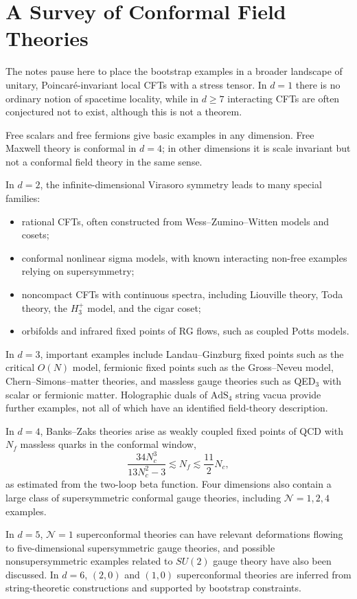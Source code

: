 \section{A Survey of Conformal Field Theories}

The notes pause here to place the bootstrap examples in a broader
landscape of unitary, Poincar\'e-invariant local CFTs with a stress
tensor.  In \(d=1\) there is no ordinary notion of spacetime locality,
while in \(d\ge7\) interacting CFTs are often conjectured not to exist,
although this is not a theorem.

Free scalars and free fermions give basic examples in any dimension.
Free Maxwell theory is conformal in \(d=4\); in other dimensions it is
scale invariant but not a conformal field theory in the same sense.

In \(d=2\), the infinite-dimensional Virasoro symmetry leads to many
special families:
\begin{itemize}
  \item rational CFTs, often constructed from Wess--Zumino--Witten
  models and cosets;
  \item conformal nonlinear sigma models, with known interacting
  non-free examples relying on supersymmetry;
  \item noncompact CFTs with continuous spectra, including Liouville
  theory, Toda theory, the \(H_3^+\) model, and the cigar coset;
  \item orbifolds and infrared fixed points of RG flows, such as
  coupled Potts models.
\end{itemize}

In \(d=3\), important examples include Landau--Ginzburg fixed points
such as the critical \(O(N)\) model, fermionic fixed points such as the
Gross--Neveu model, Chern--Simons--matter theories, and massless gauge
theories such as QED\(_3\) with scalar or fermionic matter.  Holographic
duals of \(\mathrm{AdS}_4\) string vacua provide further examples, not
all of which have an identified field-theory description.

In \(d=4\), Banks--Zaks theories arise as weakly coupled fixed points of
QCD with \(N_f\) massless quarks in the conformal window,
\[
  \frac{34N_c^3}{13N_c^2-3}
  \lesssim N_f
  \lesssim
  \frac{11}{2}N_c,
\]
as estimated from the two-loop beta function.  Four dimensions also
contain a large class of supersymmetric conformal gauge theories,
including \(\mathcal N=1,2,4\) examples.

In \(d=5\), \(\mathcal N=1\) superconformal theories can have relevant
deformations flowing to five-dimensional supersymmetric gauge theories,
and possible nonsupersymmetric examples related to \(SU(2)\) gauge
theory have also been discussed.  In \(d=6\), \((2,0)\) and \((1,0)\)
superconformal theories are inferred from string-theoretic constructions
and supported by bootstrap constraints.

